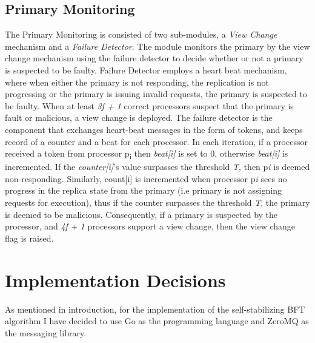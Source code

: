 \documentclass[12pt,a4paper]{report}
\begin{document}
			  \subsection{Primary Monitoring}
			    The Primary Monitoring is consisted of two sub-modules, a \textit{View Change} mechanism and a \textit{Failure Detector}. The module monitors the primary by the view change mechanism using the failure detector to decide whether or not a primary is suspected to be faulty. Failure Detector employs a heart beat mechanism, where when either the primary is not responding, the replication is not progressing or the primary is issuing invalid requests, the primary is suspected to be faulty. When at least \textit{3f + 1} correct processors suspect that the primary is fault or malicious, a view change is deployed. The failure detector is the component that exchanges heart-beat messages in the form of tokens, and keeps record of a counter and a beat for each processor. In each iteration, if a processor received a token from processor p\textsubscript{i} then \textit{beat[i]} is set to 0, otherwise \textit{beat[i]} is incremented. If the \textit{counter[i]}'s value surpasses the threshold \textit{T}, then p\textit{i} is deemed non-responding. Similarly, count[i] is incremented when processor p\textit{i} sees no progress in the replica state from the primary (i.e primary is not assigning requests for execution), thus if the counter surpasses the threshold \textit{T}, the primary is deemed to be malicious. Consequently, if a primary is suspected by the processor, and \textit{4f + 1} processors support a view change, then the view change flag is raised.
			    		

		\section{Implementation Decisions}
		    As mentioned in introduction, for the implementation of the self-stabilizing BFT algorithm I have decided to use Go as the programming language and ZeroMQ as the messaging library.
		    		
\end{document}
